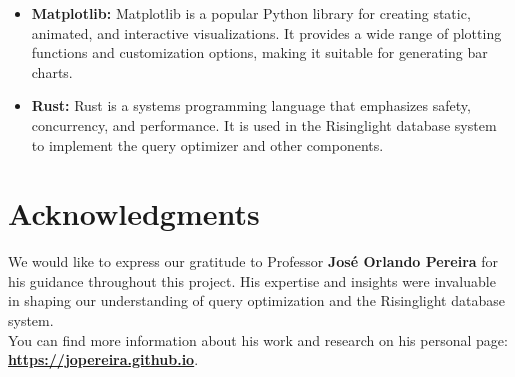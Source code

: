 \documentclass[a4paper,12pt]{scrreprt}
\renewcommand{\headrulewidth}{0pt} %
\begin{document}
\begin{itemize}
    \item \textbf{Matplotlib:} Matplotlib is a popular Python library for creating static, animated, and interactive visualizations. It provides a wide range of plotting functions and customization options, making it suitable for generating bar charts.
    \item \textbf{Rust:} Rust is a systems programming language that emphasizes safety, concurrency, and performance. It is used in the Risinglight database system to implement the query optimizer and other components.
\end{itemize}

\section{Acknowledgments}
We would like to express our gratitude to Professor \textbf{José Orlando Pereira} for his guidance throughout this project. His expertise and insights were invaluable in shaping our understanding of query optimization and the Risinglight database system. \\
You can find more information about his work and research on his personal page:\\
\textbf{ \href{https://jopereira.github.io}{https://jopereira.github.io}}. \\



\renewcommand{\headrulewidth}{0pt}
\end{document}
